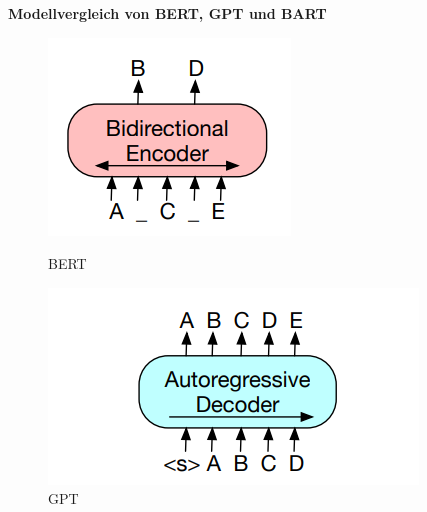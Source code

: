 \documentclass[12pt,a4paper,twoside]{article}
\begin{document}
\textbf{Modellvergleich von BERT, GPT und BART}\\

\begin{figure}[H]
    \centering
    \begin{minipage}[b]{0.2\linewidth}
        \includegraphics[width=\linewidth]{BART-Bert-erkleart.png}
        \caption{BERT}
        \label{fig:bert}
    \end{minipage}
    \hfill %
    \begin{minipage}[b]{0.3\linewidth}
        \includegraphics[width=\linewidth]{BART-Gpt-erklaert.png}
        \caption{GPT}
        \label{fig:gpt}
    \end{minipage}
    \hfill %

\end{figure}
\end{document}
